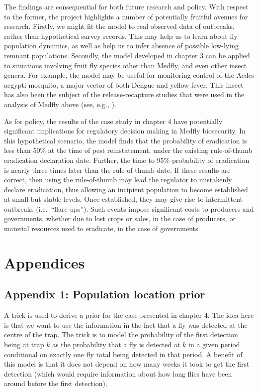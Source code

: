 \documentclass[
  oneside]{book}
\begin{document}
The findings are consequential for both future research and policy. With respect to the former, the project highlights a number of potentially fruitful avenues for research. Firstly, we might fit the model to real observed data of outbreaks, rather than hypothetical survey records. This may help us to learn about fly population dynamics, as well as help us to infer absence of possible low-lying remnant populations. Secondly, the model developed in chapter 3 can be applied to situations involving fruit fly species other than Medfly, and even other insect genera. For example, the model may be useful for monitoring control of the Aedes aegypti mosquito, a major vector of both Dengue and yellow fever. This insect has also been the subject of the release-recapture studies that were used in the analysis of Medfly above (see, e.g., \citet{russell2005mark}).

As for policy, the results of the case study in chapter 4 have potentially significant implications for regulatory decision making in Medfly biosecurity. In this hypothetical scenario, the model finds that the probability of eradication is less than 50\% at the time of pest reinstatement, under the existing rule-of-thumb eradication declaration date. Further, the time to 95\% probability of eradication is nearly three times later than the rule-of-thumb date. If these results are correct, then using the rule-of-thumb may lead the regulator to mistakenly declare eradication, thus allowing an incipient population to become established at small but stable levels. Once established, they may give rise to intermittent outbreaks (i.e.~``flare-ups''). Such events impose significant costs to producers and governments, whether due to lost crops or sales, in the case of producers, or material resources used to eradicate, in the case of governments.

\hypertarget{appendices}{%
\chapter{Appendices}\label{appendices}}

\hypertarget{appendix-1-population-location-prior}{%
\section{Appendix 1: Population location prior}\label{appendix-1-population-location-prior}}

A trick is used to derive a prior for the case presented in chapter 4. The idea here is that we want to use the information in the fact that a fly was detected at the centre of the trap. The trick is to model the probability of the first detection being at trap \(k\) as the probability that a fly is detected at \(k\) in a given period conditional on exactly one fly total being detected in that period. A benefit of this model is that it does not depend on how many weeks it took to get the first detection (which would require information about how long flies have been around before the first detection).
\end{document}
